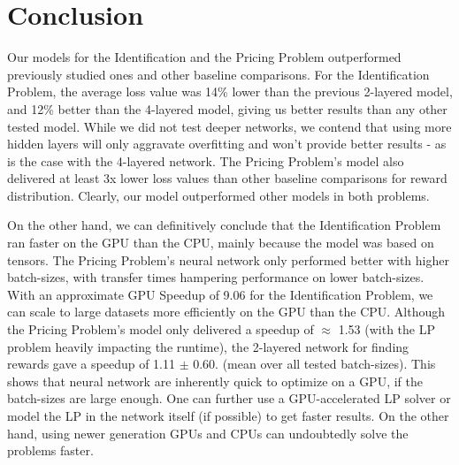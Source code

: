 \documentclass[12pt]{article}
\begin{document}
    \section{Conclusion} \label{sec:Conclusion}
    Our models for the Identification and the Pricing Problem outperformed previously studied ones \cite{Xue2016Avi2} and other baseline comparisons. For the Identification Problem, the average loss value was 14\% lower than the previous 2-layered model, and 12\% better than the 4-layered model, giving us better results than any other tested model. While we did not test deeper networks, we contend that using more hidden layers will only aggravate overfitting and won't provide better results - as is the case with the 4-layered network. The Pricing Problem's model also delivered at least 3x lower loss values than other baseline comparisons for reward distribution. Clearly, our model outperformed other models in both problems.
    
    On the other hand, we can definitively conclude that the Identification Problem ran faster on the GPU than the CPU, mainly because the model was based on tensors. The Pricing Problem's neural network only performed better with higher batch-sizes, with transfer times hampering performance on lower batch-sizes. With an approximate GPU Speedup of 9.06 for the Identification Problem, we can scale to large datasets more efficiently on the GPU than the CPU. Although the Pricing Problem's model only delivered a speedup of $\approx$ 1.53 (with the LP problem heavily impacting the runtime), the 2-layered network for finding rewards gave a speedup of 1.11 $\pm$ 0.60. (mean over all tested batch-sizes). This shows that neural network are inherently quick to optimize on a GPU, if the batch-sizes are large enough. One can further use a GPU-accelerated LP solver or model the LP in the network itself (if possible) to get faster results. On the other hand, using newer generation GPUs and CPUs can undoubtedly solve the problems faster.
    
\end{document}
